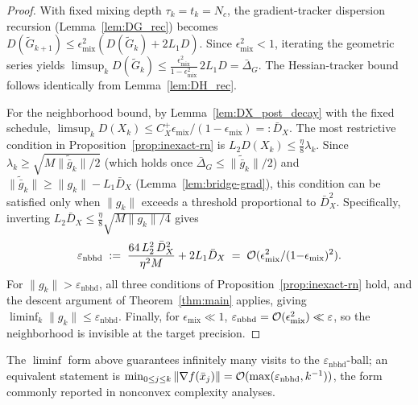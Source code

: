 \documentclass[review,onefignum,onetabnum]{siamart171218}
\begin{document}
\begin{proof}
With fixed mixing depth $\tau_k=t_k=N_c$, the gradient-tracker
dispersion recursion (Lemma~\ref{lem:DG_rec}) becomes
$D(\tilde G_{k+1})\le\epsilon_{\mathrm{mix}}^2(D(\tilde G_k)+2L_1D)$.
Since $\epsilon_{\mathrm{mix}}^2<1$, iterating the geometric series yields
$\limsup_{k}D(\tilde G_k)\le \frac{\epsilon_{\mathrm{mix}}^2}{1-\epsilon_{\mathrm{mix}}^2}\,2L_1D
=\bar\Delta_G$.
The Hessian-tracker bound follows identically from Lemma~\ref{lem:DH_rec}.

For the neighborhood bound, by Lemma~\ref{lem:DX_post_decay} with the fixed schedule,
$\limsup_k D(X_k)\le C_X^{+}\epsilon_{\mathrm{mix}}/(1-\epsilon_{\mathrm{mix}})=:\bar D_X$.
The most restrictive condition in Proposition~\ref{prop:inexact-rn}
is $L_2 D(X_k)\le\frac{\eta}{8}\lambda_k$.
Since $\lambda_k\ge\sqrt{M\|\tilde{\bar g}_k\|/2}$
(which holds once $\bar\Delta_G\le\|\tilde{\bar g}_k\|/2$) and
$\|\tilde{\bar g}_k\|\ge\|g_k\|-L_1\bar D_X$
(Lemma~\ref{lem:bridge-grad}), this condition can be satisfied only when
$\|g_k\|$ exceeds a threshold proportional to $\bar D_X^2$.
Specifically, inverting $L_2\bar D_X\le\frac{\eta}{8}\sqrt{M\|g_k\|/4}$
gives
\[
\varepsilon_{\mathrm{nbhd}}
\;:=\;
\frac{64\,L_2^2\,\bar D_X^2}{\eta^2 M}
+2L_1\bar D_X
\;=\;\mathcal{O}(\epsilon_{\mathrm{mix}}^2/(1{-}\epsilon_{\mathrm{mix}})^2).
\]
For $\|g_k\|>\varepsilon_{\mathrm{nbhd}}$, all three conditions of
Proposition~\ref{prop:inexact-rn} hold, and the descent
argument of Theorem~\ref{thm:main} applies,
giving $\liminf_k\|g_k\|\le\varepsilon_{\mathrm{nbhd}}$.
Finally, for $\epsilon_{\mathrm{mix}}\ll 1$,
$\varepsilon_{\mathrm{nbhd}}=\mathcal{O}(\epsilon_{\mathrm{mix}}^2)\ll\varepsilon$,
so the neighborhood is invisible at the target precision.
\end{proof}

\begin{remark}\label{rem:liminf_form}
The $\liminf$ form above guarantees infinitely many visits to
the $\varepsilon_{\mathrm{nbhd}}$-ball; an equivalent statement is
$\min_{0\le j\le k}\|\nabla f(\bar x_j)\|
=\mathcal{O}(\max(\varepsilon_{\mathrm{nbhd}}, k^{-1}))$,
the form commonly reported in nonconvex complexity analyses.
\end{remark}
\end{document}
